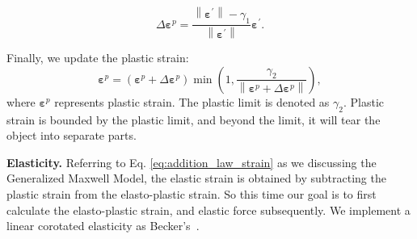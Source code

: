 \documentclass[10pt,journal,compsoc]{IEEEtran}
\begin{document}
\begin{equation}
	\Delta \mathbf{\varepsilon}^p=\frac{\left\|\mathbf{\varepsilon}^{\prime}\right\|-\gamma_1}{\left\|\mathbf{\varepsilon}^{\prime}\right\|} \mathbf{\varepsilon}^{\prime}. \label{eq:plastic-strain-increment}
\end{equation}

Finally, we update the plastic strain:
\begin{equation}
	\mathbf{\varepsilon}^p=\left(\mathbf{\varepsilon}^p+\Delta \mathbf{\varepsilon}^p\right) \min \left(1, \frac{\gamma_2}{\left\|\mathbf{\varepsilon}^p+\Delta \mathbf{\varepsilon}^p\right\|}\right),\label{eq:plastic-strain-accumulated}
\end{equation}
where $\mathbf{\varepsilon}^p$ represents plastic strain.
The plastic limit is denoted as $\gamma_2$. Plastic strain is bounded by the plastic limit, and beyond the limit, it will tear the object into separate parts.


\textbf{Elasticity.}
Referring to Eq. \ref{eq:addition_law_strain} as we discussing the Generalized Maxwell Model, the elastic strain is obtained by subtracting the plastic strain from the elasto-plastic strain.  So this time our goal is to first calculate the elasto-plastic strain, and elastic force subsequently. We implement a linear corotated elasticity as Becker's~\cite{Becker2009}.
\end{document}
